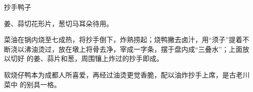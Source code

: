 \begin{recipe}{抄手鸭子}

\ingredients


\preparation

\step 姜、蒜切花形片，葱切马耳朵待用。

\step 菜油在锅内烧至七成热，将抄手倒下，炸熟捞起；烧鸭撇去卤汁，用“须子”提着不
断浇以沸油烫过，放在墩上将骨去净，宰成一字条，摆于盘内成“三叠水”；上面放以切好
的姜、蒜片和葱，周围镶上炸过的抄手即成。

\features

软烧仔鸭本为成都人所喜爱，再经过油烫更觉香脆，配以油炸抄手上席，是古老川菜中
的别具一格。

\end{recipe}

